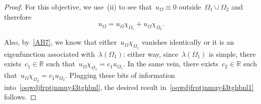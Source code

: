 \documentclass[10pt,a4paper]{amsart}
\def \R {\mathbb{R}}
\begin{document}
\begin{proof}
For this objective, we use~(ii) to see that~$u_\Omega\equiv0$ outside~$\Omega_1\cup\Omega_2$ and therefore
\begin{equation} \label{oqwdjfrptjnmuy43tghbnl}
u_\Omega=u_\Omega\chi_{\Omega_1}+u_\Omega\chi_{\Omega_2}.\end{equation} 

Also, by~\eqref{AB7}, we know that either~$u_\Omega\chi_{\Omega_1}$ 
vanishes identically or it is an eigenfunction associated with~$\lambda(\Omega_1)$: either way, since~$\lambda(\Omega_1)$ is simple, there exists~$c_1\in\R$ such that~$u_\Omega\chi_{\Omega_1}=c_1u_{\Omega_1}$. In the same vein, there exists~$c_2\in\R$ such that~$u_\Omega\chi_{\Omega_2}=c_1u_{\Omega_2}$. Plugging these bits of information into~\eqref{oqwdjfrptjnmuy43tghbnl}, the desired result in~\eqref{oqwdjfrptjnmuy43tghbnl1} follows.
\end{proof}
\end{document}
